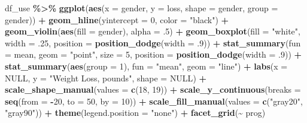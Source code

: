 \documentclass[
]{article}
\newenvironment{Shaded}{\begin{snugshade}}{\end{snugshade}}
\newcommand{\AttributeTok}[1]{\textcolor[rgb]{0.13,0.29,0.53}{#1}}
\newcommand{\ConstantTok}[1]{\textcolor[rgb]{0.56,0.35,0.01}{#1}}
\newcommand{\DecValTok}[1]{\textcolor[rgb]{0.00,0.00,0.81}{#1}}
\newcommand{\FunctionTok}[1]{\textcolor[rgb]{0.13,0.29,0.53}{\textbf{#1}}}
\newcommand{\NormalTok}[1]{#1}
\newcommand{\SpecialCharTok}[1]{\textcolor[rgb]{0.81,0.36,0.00}{\textbf{#1}}}
\newcommand{\StringTok}[1]{\textcolor[rgb]{0.31,0.60,0.02}{#1}}
\begin{document}
\begin{Shaded}
\begin{Highlighting}[]
\NormalTok{df\_use }\SpecialCharTok{\%\textgreater{}\%} 
  \FunctionTok{ggplot}\NormalTok{(}\FunctionTok{aes}\NormalTok{(}\AttributeTok{x =}\NormalTok{ gender,}
             \AttributeTok{y =}\NormalTok{ loss,}
             \AttributeTok{shape =}\NormalTok{ gender,}
             \AttributeTok{group =}\NormalTok{ gender)) }\SpecialCharTok{+} 
  \FunctionTok{geom\_hline}\NormalTok{(}\AttributeTok{yintercept =} \DecValTok{0}\NormalTok{, }\AttributeTok{color =} \StringTok{"black"}\NormalTok{) }\SpecialCharTok{+} 
  \FunctionTok{geom\_violin}\NormalTok{(}\FunctionTok{aes}\NormalTok{(}\AttributeTok{fill =}\NormalTok{ gender),}
              \AttributeTok{alpha =}\NormalTok{ .}\DecValTok{5}\NormalTok{) }\SpecialCharTok{+}
  \FunctionTok{geom\_boxplot}\NormalTok{(}\AttributeTok{fill =} \StringTok{"white"}\NormalTok{,}
               \AttributeTok{width =}\NormalTok{ .}\DecValTok{25}\NormalTok{,}
               \AttributeTok{position =} \FunctionTok{position\_dodge}\NormalTok{(}\AttributeTok{width =}\NormalTok{ .}\DecValTok{9}\NormalTok{)) }\SpecialCharTok{+}
  \FunctionTok{stat\_summary}\NormalTok{(}\AttributeTok{fun =}\NormalTok{ mean,}
               \AttributeTok{geom =} \StringTok{"point"}\NormalTok{,}
               \AttributeTok{size =} \DecValTok{5}\NormalTok{,}
               \AttributeTok{position =} \FunctionTok{position\_dodge}\NormalTok{(}\AttributeTok{width =}\NormalTok{ .}\DecValTok{9}\NormalTok{)) }\SpecialCharTok{+}
  \FunctionTok{stat\_summary}\NormalTok{(}\FunctionTok{aes}\NormalTok{(}\AttributeTok{group =} \DecValTok{1}\NormalTok{),}
               \AttributeTok{fun =} \StringTok{"mean"}\NormalTok{,}
               \AttributeTok{geom =} \StringTok{"line"}\NormalTok{) }\SpecialCharTok{+}
  \FunctionTok{labs}\NormalTok{(}\AttributeTok{x =} \ConstantTok{NULL}\NormalTok{,}
       \AttributeTok{y =} \StringTok{"Weight Loss, pounds"}\NormalTok{,}
       \AttributeTok{shape =} \ConstantTok{NULL}\NormalTok{)  }\SpecialCharTok{+}
  \FunctionTok{scale\_shape\_manual}\NormalTok{(}\AttributeTok{values =} \FunctionTok{c}\NormalTok{(}\DecValTok{18}\NormalTok{, }\DecValTok{19}\NormalTok{)) }\SpecialCharTok{+}
  \FunctionTok{scale\_y\_continuous}\NormalTok{(}\AttributeTok{breaks =} \FunctionTok{seq}\NormalTok{(}\AttributeTok{from =} \SpecialCharTok{{-}}\DecValTok{20}\NormalTok{, }\AttributeTok{to =} \DecValTok{50}\NormalTok{, }\AttributeTok{by =} \DecValTok{10}\NormalTok{)) }\SpecialCharTok{+}
  \FunctionTok{scale\_fill\_manual}\NormalTok{(}\AttributeTok{values =} \FunctionTok{c}\NormalTok{(}\StringTok{"gray20"}\NormalTok{, }\StringTok{"gray90"}\NormalTok{)) }\SpecialCharTok{+}
  \FunctionTok{theme}\NormalTok{(}\AttributeTok{legend.position =} \StringTok{"none"}\NormalTok{) }\SpecialCharTok{+}
  \FunctionTok{facet\_grid}\NormalTok{(}\SpecialCharTok{\textasciitilde{}}\NormalTok{ prog)}
\end{Highlighting}
\end{Shaded}
\end{document}
